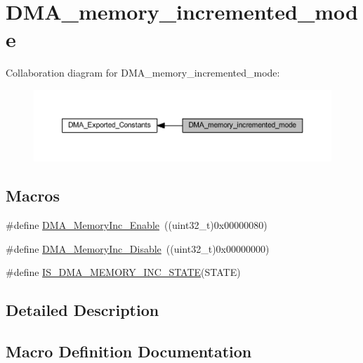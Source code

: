 \hypertarget{group___d_m_a__memory__incremented__mode}{}\section{D\+M\+A\+\_\+memory\+\_\+incremented\+\_\+mode}
\label{group___d_m_a__memory__incremented__mode}
Collaboration diagram for D\+M\+A\+\_\+memory\+\_\+incremented\+\_\+mode\+:
\nopagebreak
\begin{figure}[H]
\begin{center}
\leavevmode
\includegraphics[width=350pt]{group___d_m_a__memory__incremented__mode}
\end{center}
\end{figure}
\subsection*{Macros}
\begin{DoxyCompactItemize}
\item 
\#define \hyperlink{group___d_m_a__memory__incremented__mode_ga4e8cb23d039c74bbbf365d7678835bbb}{D\+M\+A\+\_\+\+Memory\+Inc\+\_\+\+Enable}~((uint32\+\_\+t)0x00000080)
\item 
\#define \hyperlink{group___d_m_a__memory__incremented__mode_ga795a277c997048783a383b026f19a5ab}{D\+M\+A\+\_\+\+Memory\+Inc\+\_\+\+Disable}~((uint32\+\_\+t)0x00000000)
\item 
\#define \hyperlink{group___d_m_a__memory__incremented__mode_gaa880f39d499d1e80449cf80381e4eb67}{I\+S\+\_\+\+D\+M\+A\+\_\+\+M\+E\+M\+O\+R\+Y\+\_\+\+I\+N\+C\+\_\+\+S\+T\+A\+TE}(S\+T\+A\+TE)
\end{DoxyCompactItemize}


\subsection{Detailed Description}


\subsection{Macro Definition Documentation}
\mbox{\label{group___d_m_a__memory__incremented__mode_ga795a277c997048783a383b026f19a5ab}} 
